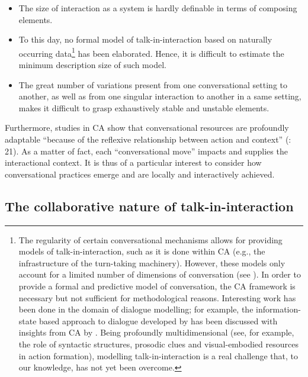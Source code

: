 \documentclass[output=paper]{langscibook}
\begin{document}
\begin{itemize}
\item The size of interaction as a system is hardly definable in terms of composing elements.

\item To this day, no formal model of talk-in-interaction based on naturally occurring data\footnote{The regularity of certain conversational mechanisms allows for providing models of talk-in-interaction, such as it is done within CA (e.g., the infrastructure of the turn-taking machinery). However, these models only account for a limited number of dimensions of conversation (see ). In order to provide a formal and predictive model of conversation, the CA framework is necessary but not sufficient for methodological reasons. Interesting work has been done in the domain of dialogue modelling; for example, the information-state based approach to dialogue developed by \citet{TraumLarsson2003} has been discussed with insights from CA by \citet{Ginzburg2012}. Being profoundly multidimensional (see, for example, the role of syntactic structures, prosodic clues and visual-embodied resources in action formation), modelling talk-in-interaction is a real challenge that, to our knowledge, has not yet been overcome.}  has been elaborated. Hence, it is difficult to estimate the minimum description size of such model.

\item The great number of variations present from one conversational setting to another, as well as from one singular interaction to another in a same setting, makes it difficult to grasp exhaustively stable and unstable elements.
\end{itemize}

\begin{sloppypar}
Furthermore, studies in CA show that conversational resources are profoundly adaptable\label{Ch12:profoundlyadaptable} “because of the reflexive relationship between action and context” (\citealt{HeritageClayman2010}: 21). As a matter of fact, each “conversational move” impacts and supplies the interactional context. It is thus of a particular interest to consider how conversational practices emerge and are locally and interactively achieved.
\end{sloppypar}

\subsection{The collaborative nature of talk-in-interaction}
\end{document}
